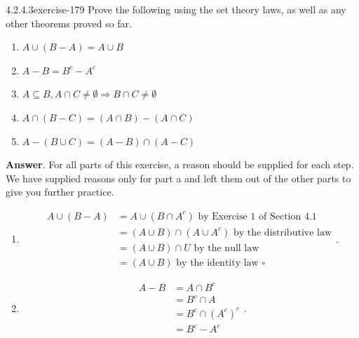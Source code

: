 \documentclass[twoside,10pt,]{book}
\numberwithin{equation}{section}
\begin{document}
\begin{divisionsolution}{4.2.4.3}{}{exercise-179}%
\hypertarget{p-1599}{}%
Prove the following using the set theory laws, as well as any other theorems proved so far.%
\par
\hypertarget{p-1600}{}%
\leavevmode%
\begin{enumerate}[label=(\alph*)]
\item\hypertarget{li-848}{}\(A \cup  (B - A) = A \cup  B\)%
\item\hypertarget{li-849}{}\(A - B = B^c - A ^c\)%
\item\hypertarget{li-850}{}\(A\subseteq B, A\cap C \neq \emptyset  \Rightarrow  B\cap C \neq \emptyset\)%
\item\hypertarget{li-851}{}\(A\cap (B - C) = (A\cap B) - (A\cap C)\)%
\item\hypertarget{li-852}{}\(A - (B \cup  C) = (A - B)\cap (A - C)\)%
\end{enumerate}
%
\par\smallskip%
\noindent\textbf{Answer}.\quad%
\hypertarget{p-1601}{}%
For all parts of this exercise, a reason should be supplied for each step. We have supplied reasons only for part a and left them out of the other parts to give you further practice.%
\par
\hypertarget{p-1602}{}%
\leavevmode%
\begin{enumerate}[label=(\alph*)]
\item\hypertarget{li-853}{}\hypertarget{p-1603}{}%
%
\begin{equation*}
\begin{split}
A \cup (B-A)&=A\cup (B \cap A^c) \textrm{  by Exercise 1 of Section 4.1}\\
& =(A\cup B)\cap (A\cup A^c) \textrm{  by the distributive law}\\
&=(A\cup B)\cap U \textrm{  by the null law}\\
&=(A\cup B) \textrm{  by the identity law }  \square
\end{split}\text{.}
\end{equation*}
%
\item\hypertarget{li-854}{}\hypertarget{p-1604}{}%
%
\begin{equation*}
\begin{split}
A - B & = A \cap B ^c\\
&  =B^c\cap A\\
&=B^c\cap (A^c)^c\\
&=B^c-A^c\\
\end{split}\text{.}

\end{equation*}
\end{enumerate}
\end{divisionsolution}
\end{document}
